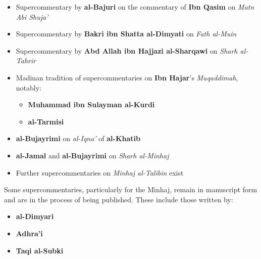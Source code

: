\documentclass[
  a4paper,
  DIV=11,
  numbers=noendperiod]{scrartcl}
\providecommand{\tightlist}{%
  \setlength{\itemsep}{0pt}\setlength{\parskip}{0pt}}
\begin{document}
\begin{itemize}
\tightlist
\item
  Supercommentary by \textbf{al-Bajuri} on the commentary of \textbf{Ibn
  Qasim} on \emph{Matn Abi Shuja'}
\item
  Supercommentary by \textbf{Bakri ibn Shatta al-Dimyati} on \emph{Fath
  al-Muin}
\item
  Supercommentary by \textbf{Abd Allah ibn Hajjazi al-Sharqawi} on
  \emph{Sharh al-Tahrir}
\item
  Madinan tradition of supercommentaries on \textbf{Ibn Hajar}'s
  \emph{Muqaddimah}, notably:

  \begin{itemize}
  \tightlist
  \item
    \textbf{Muhammad ibn Sulayman al-Kurdi}
  \item
    \textbf{al-Tarmisi}
  \end{itemize}
\item
  \textbf{al-Bujayrimi} on \emph{al-Iqna'} of \textbf{al-Khatib}
\item
  \textbf{al-Jamal} and \textbf{al-Bujayrimi} on \emph{Sharh al-Minhaj}
\item
  Further supercommentaries on \emph{Minhaj al-Talibin} exist
\end{itemize}

\begin{tcolorbox}[enhanced jigsaw, titlerule=0mm, opacitybacktitle=0.6, toptitle=1mm, opacityback=0, left=2mm, breakable, rightrule=.15mm, arc=.35mm, colframe=quarto-callout-note-color-frame, leftrule=.75mm, colback=white, colbacktitle=quarto-callout-note-color!10!white, coltitle=black, bottomtitle=1mm, title=\textcolor{quarto-callout-note-color}{\faInfo}\hspace{0.5em}{Unpublished Treasures}, toprule=.15mm, bottomrule=.15mm]

Some supercommentaries, particularly for the Minhaj, remain in
manuscript form and are in the process of being published. These include
those written by:

\begin{itemize}
\tightlist
\item
  \textbf{al-Dimyari}
\item
  \textbf{Adhra'i}
\item
  \textbf{Taqi al-Subki}
\end{itemize}

\end{tcolorbox}
\end{document}
